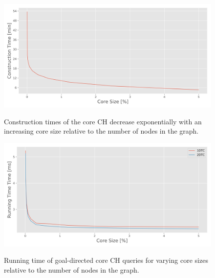 \begin{figure}[hbtp]
	\centering
	\includegraphics[width=.95\textwidth]{plots/thesis_core_sizes-csp-parking_europe_hgv-constr_time.png}
	\label{fig:preprocessing_time_core_ch}
	\caption{Construction times of the core CH decrease exponentially with an increasing core size relative to the number of nodes in the graph.}
\end{figure}

\begin{figure}[hbtp]
	\centering
	\includegraphics[width=.95\textwidth]{plots/thesis_core_sizes-csp-parking_europe_hgv-time_ms.png}
	\label{fig:query_time_core_ch_sizes}
	\caption{Running time of goal-directed core CH queries for varying core sizes relative to the number of nodes in the graph.}
\end{figure}

